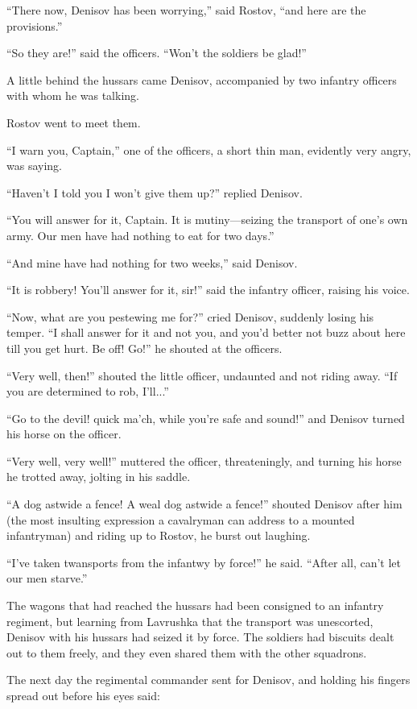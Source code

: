 ``There now, Denisov has been worrying,'' said Rostov, ``and here
are the provisions.''

``So they are!'' said the officers. ``Won't the soldiers be
glad!''

A little behind the hussars came Denisov, accompanied by two
infantry officers with whom he was talking.

Rostov went to meet them.

``I warn you, Captain,'' one of the officers, a short thin man,
evidently very angry, was saying.

``Haven't I told you I won't give them up?'' replied Denisov.

``You will answer for it, Captain. It is mutiny---seizing the
transport of one's own army. Our men have had nothing to eat for
two days.''

``And mine have had nothing for two weeks,'' said Denisov.

``It is robbery! You'll answer for it, sir!'' said the infantry
officer, raising his voice.

``Now, what are you pestewing me for?'' cried Denisov, suddenly
losing his temper. ``I shall answer for it and not you, and you'd
better not buzz about here till you get hurt. Be off! Go!'' he
shouted at the officers.

``Very well, then!'' shouted the little officer, undaunted and
not riding away. ``If you are determined to rob, I'll...''

``Go to the devil! quick ma'ch, while you're safe and sound!''
and Denisov turned his horse on the officer.

``Very well, very well!'' muttered the officer, threateningly,
and turning his horse he trotted away, jolting in his saddle.

``A dog astwide a fence! A weal dog astwide a fence!'' shouted
Denisov after him (the most insulting expression a cavalryman can
address to a mounted infantryman) and riding up to Rostov, he
burst out laughing.

``I've taken twansports from the infantwy by force!'' he
said. ``After all, can't let our men starve.''

The wagons that had reached the hussars had been consigned to an
infantry regiment, but learning from Lavrushka that the transport
was unescorted, Denisov with his hussars had seized it by
force. The soldiers had biscuits dealt out to them freely, and
they even shared them with the other squadrons.

The next day the regimental commander sent for Denisov, and
holding his fingers spread out before his eyes said:

